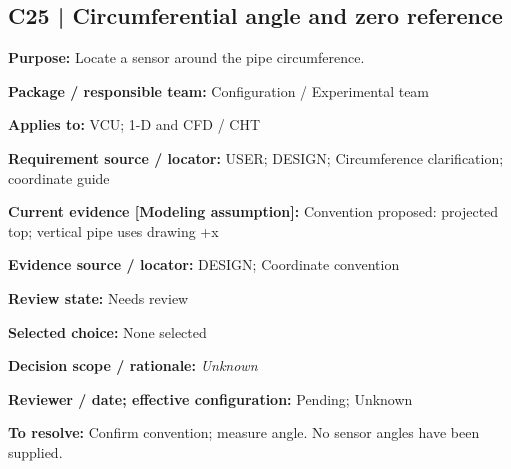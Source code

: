 \documentclass[11pt]{article}
\begin{document}
\begin{minipage}{\textwidth}\small\setlength{\parskip}{2pt}
\subsection*{C25 | Circumferential angle and zero reference}
\textbf{Purpose:} Locate a sensor around the pipe circumference.\par
\textbf{Package / responsible team:} Configuration / Experimental team\par
\textbf{Applies to:} VCU; 1-D and CFD / CHT\par
\textbf{Requirement source / locator:} USER; DESIGN; Circumference clarification; coordinate guide\par
\textbf{Current evidence [Modeling assumption]:} Convention proposed: projected top; vertical pipe uses drawing +x\par
\textbf{Evidence source / locator:} DESIGN; Coordinate convention\par
\textbf{Review state:} Needs review\par
\textbf{Selected choice:} None selected\par
\textbf{Decision scope / rationale:} \textit{Unknown}\par
\textbf{Reviewer / date; effective configuration:} Pending; Unknown\par
\textbf{To resolve:} Confirm convention; measure angle. No sensor angles have been supplied.\par
\end{minipage}\par\vspace{5pt}
\end{document}
